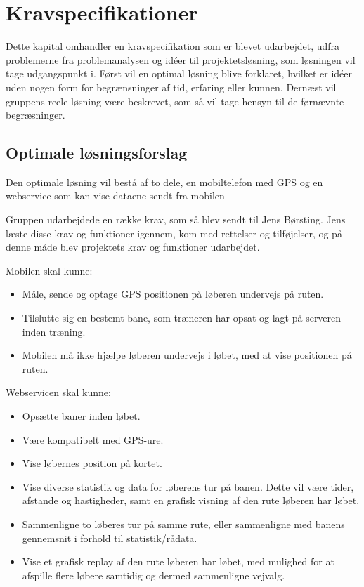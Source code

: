 \chapter{Kravspecifikationer}
 Dette kapital omhandler en kravspecifikation som er blevet udarbejdet, udfra problemerne fra problemanalysen og idéer til projektetsløsning, som løsningen vil tage udgangspunkt i. Først vil en optimal løsning blive forklaret, hvilket er idéer uden nogen form for begrænsninger af tid, erfaring eller kunnen. Dernæst vil gruppens reele løsning være beskrevet, som så vil tage hensyn til de førnævnte begræsninger.

\section{Optimale løsningsforslag}
Den optimale løsning vil bestå af to dele, en mobiltelefon med GPS og en webservice som kan vise dataene sendt fra mobilen

Gruppen udarbejdede en række krav, som så blev sendt til Jens Børsting. Jens læste disse krav og funktioner igennem, kom med rettelser og tilføjelser, og på denne måde blev projektets krav og funktioner udarbejdet. 

Mobilen skal kunne:
\begin{itemize}
	\item Måle, sende og optage GPS positionen på løberen undervejs på ruten.
	\item Tilslutte sig en bestemt bane, som træneren har opsat og lagt på serveren inden træning.
	\item Mobilen må ikke hjælpe løberen undervejs i løbet, med at vise positionen på ruten.
\end{itemize}

Webservicen skal kunne:
\begin{itemize}
	\item Opsætte baner inden løbet.
	\item Være kompatibelt med GPS-ure.
	\item Vise løbernes position på kortet.
	\item Vise diverse statistik og data for løberens tur på banen. Dette vil være tider, afstande og hastigheder, samt en grafisk visning af den rute løberen har løbet.
	\item Sammenligne to løberes tur på samme rute, eller sammenligne med banens gennemsnit i forhold til statistik/rådata.
	\item Vise et grafisk replay af den rute løberen har løbet, med mulighed for at afspille flere løbere samtidig og dermed sammenligne vejvalg.
\end{itemize} 

